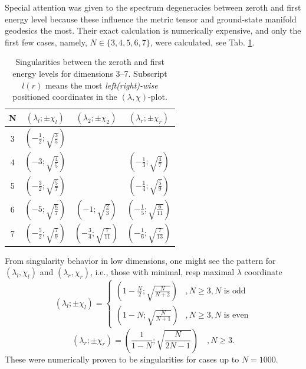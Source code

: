 Special attention was given to the spectrum degeneracies between zeroth and first energy level because these influence the metric tensor and ground-state manifold geodesics the most. Their exact calculation is numerically expensive, and only the first few cases, namely, $N\in\{3,4,5,6,7\}$, were calculated, see Tab. \ref{tab:singularities}. 
\begin{table}[H]
    \centering
    \begin{tabular}{c||c|c|c}
     N&$(\lambda_l;\pm\chi_l)$&$(\lambda_2;\pm\chi_2)$&$(\lambda_r;\pm\chi_r)$        \\ \hline\hline
     3&$(-\frac{1}{2};\sqrt{\frac{3}{5}}) $&                                       &                                         \\
     4&$(-3          ;\sqrt{\frac{4}{5}}) $&                                       & $(-\frac{1}{3};\sqrt{\frac{4}{7}})$     \\
     5&$(-\frac{3}{2};\sqrt{\frac{5}{7}}) $&                                       & $(-\frac{1}{4};\sqrt{\frac{5}{9}})$     \\
     6&$(-5          ;\sqrt{\frac{6}{7}}) $&$(-1          ;\sqrt{\frac{2}{3}}) $   & $(-\frac{1}{5};\sqrt{\frac{6}{11}})$     \\
     7&$(-\frac{5}{2};\sqrt{\frac{7}{9}}) $&$(-\frac{3}{4};\sqrt{\frac{7}{11}}) $  & $(-\frac{1}{6};\sqrt{\frac{7}{13}})$ 
    \end{tabular}
    \caption{Singularities between the zeroth and first energy levels for dimensions 3--7. Subscript $l(r)$ means the most \emph{left(right)-wise} positioned coordinates in the $(\lambda,\chi)$-plot.}
    \label{tab:singularities}
    \end{table} 

From singularity behavior in low dimensions, one might see the pattern for $(\lambda_l,\chi_l)$ and $(\lambda_r,\chi_r)$, i.e., those with minimal, resp maximal $\lambda$ coordinate
\begin{equation}
    (\lambda_l ;\pm\chi_l)= \begin{cases}
        \left(1-\frac{N}{2};\sqrt{\frac{N}{N+2}}\right) & , N\geq 3,N\text{ is odd}\\
        \left(1-N;\sqrt{\frac{N}{N+1}}\right) & , N\geq 3,N\text{ is even}
    \end{cases}
    \label{eq:singularityCoordinateFormulaLeft}
\end{equation}
\begin{equation}
    (\lambda_r ;\pm\chi_r)= 
        \left(\frac{1}{1-N};\sqrt{\frac{N}{2N-1}}\right)\quad , N\geq 3.
        \label{eq:singularityCoordinateFormulaRight}
\end{equation}
These were numerically proven to be singularities for cases up to $N=1000$. 

